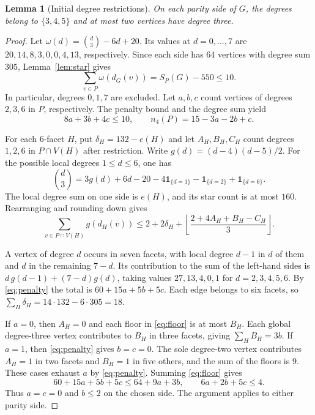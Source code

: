 \documentclass[11pt,reqno]{amsart}
\numberwithin{equation}{section}
\newtheorem{lemma}[theorem]{Lemma}
\newcommand{\one}{\mathbf{1}}
\begin{document}
\begin{lemma}[Initial degree restrictions]\label{lem:initial}
On each parity side of \(G\), the degrees belong to \(\{3,4,5\}\)
and at most two vertices have degree three.
\end{lemma}

\begin{proof}
Let \(\omega(d)=\binom d3-6d+20\). Its values at \(d=0,\ldots,7\) are
\(20,14,8,3,0,0,4,13\), respectively. Since each side has \(64\)
vertices with degree sum \(305\), Lemma~\ref{lem:star} gives
\[
  \sum_{v\in P}\omega(d_G(v))=S_P(G)-550\le10 .
\]
In particular, degrees \(0,1,7\) are excluded. Let \(a,b,c\) count
vertices of degrees \(2,3,6\) in \(P\), respectively. The penalty
bound and the degree sum yield
\begin{equation}\label{eq:penalty}
  8a+3b+4c\le10,\qquad n_4(P)=15-3a-2b+c.
\end{equation}

For each \(6\)-facet \(H\), put \(\delta_H=132-e(H)\) and
let \(A_H,B_H,C_H\) count degrees \(1,2,6\) in \(P\cap V(H)\)
after restriction. Write \(g(d)=(d-4)(d-5)/2\). For the possible
local degrees \(1\le d\le6\), one has
\[
  \binom d3=3g(d)+6d-20
      -4\one_{\{d=1\}}-\one_{\{d=2\}}+\one_{\{d=6\}} .
\]
The local degree sum on one side is \(e(H)\), and its star count is
at most \(160\). Rearranging and rounding down gives
\begin{equation}\label{eq:floor}
  \sum_{v\in P\cap V(H)}g(d_H(v))
  \le 2+2\delta_H+
      \left\lfloor\frac{2+4A_H+B_H-C_H}{3}\right\rfloor .
\end{equation}

A vertex of degree \(d\) occurs in seven facets, with local degree
\(d-1\) in \(d\) of them and \(d\) in the remaining \(7-d\).
Its contribution to the sum of the left-hand sides is
\(d\,g(d-1)+(7-d)g(d)\), taking values \(27,13,4,0,1\)
for \(d=2,3,4,5,6\). By \eqref{eq:penalty} the total is
\(60+15a+5b+5c\). Each edge belongs to six facets, so
\(\sum_H\delta_H=14\cdot132-6\cdot305=18\).

If \(a=0\), then \(A_H=0\) and each floor in \eqref{eq:floor}
is at most \(B_H\). Each global degree-three vertex contributes to
\(B_H\) in three facets, giving \(\sum_H B_H=3b\).
If \(a=1\), then \eqref{eq:penalty} gives \(b=c=0\). The sole
degree-two vertex contributes \(A_H=1\) in two facets and
\(B_H=1\) in five others, and the sum of the floors is \(9\).
These cases exhaust \(a\) by \eqref{eq:penalty}. Summing
\eqref{eq:floor} gives
\[
  60+15a+5b+5c\le 64+9a+3b,
  \qquad 6a+2b+5c\le4 .
\]
Thus \(a=c=0\) and \(b\le2\) on the chosen side. The argument
applies to either parity side.
\end{proof}
\end{document}
